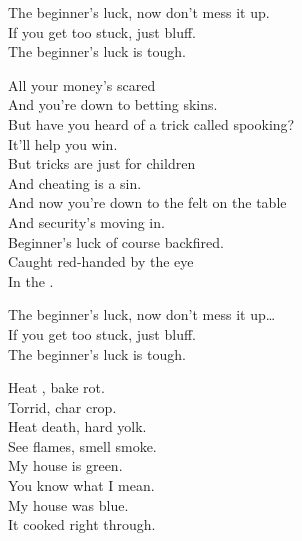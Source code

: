 
The beginner's luck, now don't mess it up. \\
If you get too stuck, just bluff. \\
The beginner's luck is tough. \\


All your money's scared \\
And you're down to betting skins. \\
But have you heard of a trick called spooking? \\
It'll help you win. \\

But tricks are just for children \\
And cheating is a sin. \\
And now you're down to the felt on the table \\
And security's moving in. \\

Beginner's luck of course backfired. \\
Caught red-handed by the eye \\
In the . \\


The beginner's luck, now don't mess it up… \\
If you get too stuck, just bluff. \\
The beginner's luck is tough. \\





Heat , bake rot. \\
Torrid, char crop. \\
Heat death, hard yolk. \\
See flames, smell smoke. \\

My house is green. \\
You know what I mean. \\
My house was blue. \\
It cooked right through. \\

